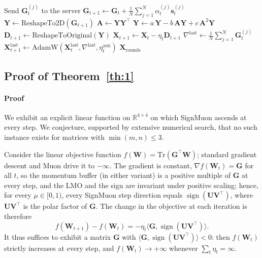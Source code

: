 \documentclass{article}
\begin{document}
\begin{algorithm}[H]
\begin{algorithmic}[1]
            \State Send $\mathbf{G}_t^{(j)}$ to the server
        \EndFor
    \EndFor
    \State $\mathbf{G}_{t+1} \gets \mathbf{G}_t + \frac{1}{N} \sum_{j=1}^N \alpha_t^{(j)} \mathbf{s}_t^{(j)}$ 
        \State $\mathbf{Y} \gets \text{ReshapeTo2D}(\mathbf{G}_{t+1})$
         
            \State $\mathbf{A} \gets \mathbf{Y} \mathbf{Y}^\top$
            \State $\mathbf{Y} \gets a\,\mathbf{Y} - b\,\mathbf{A}\mathbf{Y} + c\,\mathbf{A}^2\mathbf{Y}$
        \EndFor
        \State $\mathbf{D}_{t+1} \gets \text{ReshapeToOriginal}(\mathbf{Y})$
        \State $\mathbf{X}_{t+1} \gets \mathbf{X}_t - \eta_t \mathbf{D}_{t+1}$ 
    \EndFor
    \State $\nabla^{\text{last}} \gets \frac{1}{N} \sum_{j=1}^N \mathbf{G}_t^{(j)}$
    \State $\mathbf{X}_{t+1}^{\text{last}} \gets \text{AdamW}(\mathbf{X}_t^{\text{last}}, \nabla^{\text{last}}, \eta_t^{\text{aux}})$ 
\EndFor
\State \Return $\mathbf{X}_{\mathrm{rounds}}$
\label{ef21_alg}
\end{algorithmic}
\end{algorithm}

\newpage
\subsection{Proof of Theorem~\ref{th:1}}\label{app:proof_th1}

\paragraph{Proof} We exhibit an explicit linear function on $\mathbb{R}^{4\times4}$ on which SignMuon ascends at every step. We conjecture, supported by extensive numerical search, that no such instance exists for matrices with $\min(m,n) \le 3$.

Consider the linear objective function $f(\mathbf{W}) = \mathrm{Tr}(\mathbf{G}^\top \mathbf{W})$; standard gradient descent and Muon drive it to $-\infty$. The gradient is constant, $\nabla f(\mathbf{W}_t) = \mathbf{G}$ for all $t$, so the momentum buffer (in either variant) is a positive multiple of $\mathbf{G}$ at every step, and the LMO and the sign are invariant under positive scaling; hence, for every $\mu \in [0,1)$, every SignMuon step direction equals $\operatorname{sign}(\mathbf{U}\mathbf{V}^\top)$, where $\mathbf{U}\mathbf{V}^\top$ is the polar factor of $\mathbf{G}$. The change in the objective at each iteration is therefore
\begin{equation}
f(\mathbf{W}_{t+1}) - f(\mathbf{W}_t) = -\eta_t \langle \mathbf{G}, \operatorname{sign}(\mathbf{U} \mathbf{V}^\top) \rangle.
\end{equation}
It thus suffices to exhibit a matrix $\mathbf{G}$ with $\langle \mathbf{G}, \operatorname{sign}(\mathbf{U} \mathbf{V}^\top) \rangle < 0$: then $f(\mathbf{W}_t)$ strictly increases at every step, and $f(\mathbf{W}_t) \to +\infty$ whenever $\sum_t \eta_t = \infty$.
\end{document}
